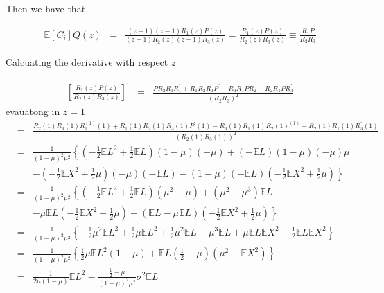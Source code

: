 \documentclass{article}
\newcommand{\esp}{\mathbb{E}}
\begin{document}
Then we have that 

\begin{eqnarray}
\esp\left[C_{i}\right]Q\left(z\right)&=&\frac{\left(z-1\right)\left(z-1\right)R_{1}\left(z\right)P\left(z\right)}{\left(z-1\right)R_{2}\left(z\right)\left(z-1\right)R_{3}\left(z\right)}
=\frac{R_{1}\left(z\right)P\left(z\right)}{R_{2}\left(z\right)R_{3}\left(z\right)}\equiv\frac{R_{1}P}{R_{2}R_{3}}
\end{eqnarray}

Calcuating the derivative with respect $z$

\begin{eqnarray}\label{Ec.Primer.Derivada.Q}
\left[\frac{R_{1}\left(z\right)P\left(z\right)}{R_{2}\left(z\right)R_{3}\left(z\right)}\right]^{'}&=&\frac{PR_{2}R_{3}R_{1}^{'}
+R_{1}R_{2}R_{3}P^{'}-R_{3}R_{1}PR_{2}-R_{2}R_{1}PR_{3}^{'}}{\left(R_{2}R_{3}\right)^{2}}
\end{eqnarray}
evauatong in $z=1$
\begin{eqnarray*}
&=&\frac{R_{2}(1)R_{3}(1)R_{1}^{(1)}(1)+R_{1}(1)R_{2}(1)R_{3}(1)P^{'}(1)-R_{3}(1)R_{1}(1)R_{2}(1)^{(1)}-R_{2}(1)R_{1}(1)R_{3}^{'}(1)}{\left(R_{2}(1)R_{3}(1)\right)^{2}}\\
&=&\frac{1}{\left(1-\mu\right)^{2}\mu^{2}}\left\{\left(-\frac{1}{2}\esp L^{2}+\frac{1}{2}\esp L\right)\left(1-\mu\right)\left(-\mu\right)+\left(-\esp L\right)\left(1-\mu\right)\left(-\mu\right)\mu\right.\\
&&\left.-\left(-\frac{1}{2}\esp X^{2}+\frac{1}{2}\mu\right)\left(-\mu\right)\left(-\esp L\right)-\left(1-\mu\right)\left(-\esp L\right)\left(-\frac{1}{2}\esp X^{2}+\frac{1}{2}\mu\right)\right\}\\
&=&\frac{1}{\left(1-\mu\right)^{2}\mu^{2}}\left\{\left(-\frac{1}{2}\esp L^{2}+\frac{1}{2}\esp L\right)\left(\mu^{2}-\mu\right)
+\left(\mu^{2}-\mu^{3}\right)\esp L\right.\\
&&\left.-\mu\esp L\left(-\frac{1}{2}\esp X^{2}+\frac{1}{2}\mu\right)
+\left(\esp L-\mu\esp L\right)\left(-\frac{1}{2}\esp X^{2}+\frac{1}{2}\mu\right)\right\}\\
&=&\frac{1}{\left(1-\mu\right)^{2}\mu^{2}}\left\{-\frac{1}{2}\mu^{2}\esp L^{2}
+\frac{1}{2}\mu\esp L^{2}
+\frac{1}{2}\mu^{2}\esp L
-\mu^{3}\esp L
+\mu\esp L\esp X^{2}
-\frac{1}{2}\esp L\esp X^{2}\right\}\\
&=&\frac{1}{\left(1-\mu\right)^{2}\mu^{2}}\left\{
\frac{1}{2}\mu\esp L^{2}\left(1-\mu\right)
+\esp L\left(\frac{1}{2}-\mu\right)\left(\mu^{2}-\esp X^{2}\right)\right\}\\
&=&\frac{1}{2\mu\left(1-\mu\right)}\esp L^{2}-\frac{\frac{1}{2}-\mu}{\left(1-\mu\right)^{2}\mu^{2}}\sigma^{2}\esp L
\end{eqnarray*}
\end{document}
